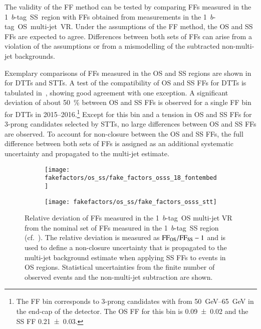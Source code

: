 The validity of the FF method can be tested by comparing FFs measured in the
1~$b$-tag~SS~region with FFs obtained from measurements in the
1~$b$-tag~OS~multi-jet~VR. Under the assumptions of the FF method, the OS and SS
FFs are expected to agree. Differences between both sets of FFs can arise from a
violation of the assumptions or from a mismodelling of the subtracted
non-multi-jet backgrounds.

Exemplary comparisons of FFs measured in the OS and SS regions are shown
in~ for DTTs and STTs. A test of the compatibility of
OS and SS FFs for DTTs is tabulated in~,
showing good agreement with one exception. A significant deviation of about
\SI{50}{\percent} between OS and SS FFs is observed for a single FF bin for DTTs
in 2015--2016.\footnote{The FF bin corresponds to 3-prong \tauhadvis candidates
  with \pT from \SIrange{50}{65}{\GeV} in the end-cap of the detector. The OS FF
  for this bin is \num{0.09 +- 0.02} and the SS FF \num{0.21 +- 0.03}.} Except
for this bin and a tension in OS and SS FFs for 3-prong \tauhadvis candidates
selected by STTs, no large differences between OS and SS FFs are observed.
To account for non-closure between the OS and SS FFs, the full difference
between both sets of FFs is assigned as an additional systematic uncertainty and
propagated to the multi-jet estimate.

\begin{figure}[htbp]
  \centering

  \begin{subfigure}[t]{0.48\textwidth}
    \texttt{[image: fakefactors/os\_ss/fake\_factors\_osss\_18\_fontembed]}
    \label{fig:fake_factor_OSSS_dtt}
  \end{subfigure}\hfill%
  \begin{subfigure}[t]{0.48\textwidth}
    \texttt{[image: fakefactors/os\_ss/fake\_factors\_osss\_stt]}
    \label{fig:fake_factor_OSSS_stt}
  \end{subfigure}

  \caption[Comparison of OS and SS FFs in the \hadhad channel.]{Relative
    deviation of FFs measured in the 1~$b$-tag~OS multi-jet VR from the nominal
    set of FFs measured in the 1~$b$-tag~SS region
    (cf.~). The relative
    deviation is measured as $\text{FF}_\text{OS} / \text{FF}_\text{SS} - 1$ and is used to
    define a non-closure uncertainty that is propagated to the multi-jet
    background estimate when applying SS FFs to events in OS
    regions. Statistical uncertainties from the finite number of observed events
    and the non-multi-jet subtraction are shown.}%
  \label{fig:fake_factor_OSSS}
\end{figure}

